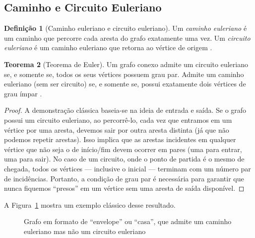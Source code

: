 \documentclass[
  12pt,
  oneside,
  a4paper,
  english,
  brazilian
  ]{abntex2}
\theoremstyle{definition}
\newtheorem{definicao}{Definição}[chapter]
\newtheorem{teorema}[definicao]{Teorema}
\begin{document}
\subsection{Caminho e Circuito Euleriano}
\label{sec:euleriano}

\begin{definicao}[Caminho euleriano e circuito euleriano]
\label{def:euleriano}
  Um \textit{caminho euleriano} é um caminho que percorre cada aresta do grafo
  exatamente uma vez. Um \textit{circuito euleriano} é um caminho euleriano
  que retorna ao vértice de origem \cite{euler1736}.
\end{definicao}

\begin{teorema}[Teorema de Euler]
\label{teo:euler}
  Um grafo conexo admite um circuito euleriano se, e somente se, todos os seus
  vértices possuem grau par. Admite um caminho euleriano (sem ser circuito) se,
  e somente se, possui exatamente dois vértices de grau ímpar
  \cite{diestel2017}.
\end{teorema}

\begin{proof}
  A demonstração clássica baseia-se na ideia de entrada e saída. Se o grafo possui um circuito euleriano, ao percorrê-lo, cada vez que entramos em um vértice por uma aresta, devemos sair por outra aresta distinta (já que não podemos repetir arestas). Isso implica que as arestas incidentes em qualquer vértice que não seja o de início/fim devem ocorrer em pares (uma para entrar, uma para sair). No caso de um circuito, onde o ponto de partida é o mesmo de chegada, todos os vértices — inclusive o inicial — terminam com um número par de incidências. Portanto, a condição de grau par é necessária para garantir que nunca fiquemos ``presos'' em um vértice sem uma aresta de saída disponível.
\end{proof}

A Figura~\ref{fig:euleriano} mostra um exemplo clássico desse resultado.

\begin{figure}[htbp]
    \centering
    \caption{Grafo em formato de ``envelope'' ou ``casa'', que admite um caminho euleriano mas não um circuito euleriano}
    \label{fig:euleriano}
\end{figure}
\end{document}
